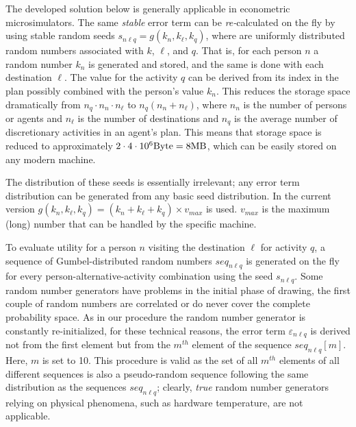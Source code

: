 The developed solution below is generally applicable in econometric microsimulators. The same \emph{stable} error term can be \emph{re-}calculated on the fly by using stable random seeds $s_{n\ell q} = g(k_n, k_\ell, k_q)$, where are uniformly distributed random numbers associated with $k$, $\ell$, and $q$. 
That is, for each person $n$ a random number $k_n$ is generated and stored, and the same is done with each destination $\ell$. 
The value for the activity $q$ can be derived from its index in the plan possibly combined with the person's value $k_n$. 
This reduces the storage space dramatically from $n_q \cdot n_n \cdot n_{\ell}$ to $n_q (n_n + n_{\ell})$, where $n_n$ is the number of persons or agents and $n_{\ell}$ is the number of destinations and $n_q$ is the average number of discretionary activities in an agent's plan.  
This means that storage space is reduced to approximately $2 \cdot 4 \cdot 10^{6} \hbox{Byte} = 8 \hbox{MB}$, which can be easily stored 
on any modern machine.

The distribution of these seeds is essentially irrelevant; any error term distribution can be generated from any basic seed distribution. 
In the current version $g(k_n, k_\ell, k_q) = (k_n + k_\ell + k_q) \times v_{max}$ is used. $v_{max}$ is the maximum (long) number that can be handled by the specific machine.

To evaluate utility for a person $n$ visiting the destination $\ell$ for activity $q$, a sequence of Gumbel-distributed random numbers $seq_{n\ell q}$ is generated on the fly for every person-alternative-activity combination using the seed $s_{n\ell q}$. 
Some random number generators have problems in the initial phase of drawing, \eg the first couple of random numbers are correlated or do never cover the complete probability space. As in our procedure the random number generator is constantly re-initialized, for these technical reasons, the error term $\varepsilon_{n\ell q}$ is derived not from the first element but from the $m^{th}$ element of the sequence $seq_{n\ell q}[m]$. 
Here, $m$ is set to 10. 
This procedure is valid as the set of all  $m^{th}$ elements of all different sequences is also a pseudo-random sequence following the same distribution as the sequences $seq_{n\ell q}$; clearly, \emph{true} random number generators relying on physical phenomena, such as hardware temperature, are not applicable. 

